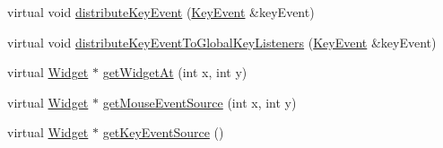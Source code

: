 \begin{DoxyCompactItemize}
virtual void \hyperlink{classgcn_1_1Gui_aabaf700c710b66b93185c7733d820b07}{distribute\+Key\+Event} (\hyperlink{classgcn_1_1KeyEvent}{Key\+Event} \&key\+Event)
\item 
virtual void \hyperlink{classgcn_1_1Gui_a815207b12b22f2154cb8873f74f00d40}{distribute\+Key\+Event\+To\+Global\+Key\+Listeners} (\hyperlink{classgcn_1_1KeyEvent}{Key\+Event} \&key\+Event)
\item 
virtual \hyperlink{classgcn_1_1Widget}{Widget} $\ast$ \hyperlink{classgcn_1_1Gui_adbe10b9a50543f7f0ecaed5eb162c3c4}{get\+Widget\+At} (int x, int y)
\item 
virtual \hyperlink{classgcn_1_1Widget}{Widget} $\ast$ \hyperlink{classgcn_1_1Gui_a5e018eff39f41e7e7a9e52e3dd8a919e}{get\+Mouse\+Event\+Source} (int x, int y)
\item 
virtual \hyperlink{classgcn_1_1Widget}{Widget} $\ast$ \hyperlink{classgcn_1_1Gui_ad2e0e4f5cdfb5bc0901fdf81d222196f}{get\+Key\+Event\+Source} ()
\end{DoxyCompactItemize}
